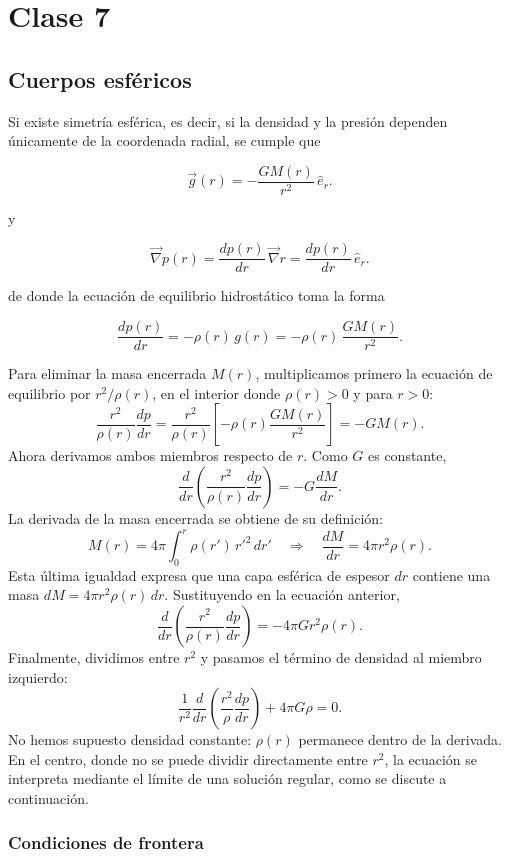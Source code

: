 \shorthandoff{<>}



\shorthandon{<>}

\chapter{Clase 7}

\section{Cuerpos esféricos}

Si existe simetría esférica, es decir, si la densidad y la presión dependen únicamente de la coordenada radial, se cumple que

$$ \vec{g}(r) = -\frac{G M(r)}{r^2}\,\hat{e}_r. $$

y

$$ \vec{\nabla}p(r) = \frac{dp(r)}{dr}\,\vec{\nabla}r = \frac{dp(r)}{dr}\,\hat{e}_r. $$

de donde la ecuación de equilibrio hidrostático toma la forma

$$ \frac{dp(r)}{dr} = -\rho(r)\,g(r) = -\rho(r)\,\frac{G M(r)}{r^2}. $$

Para eliminar la masa encerrada $M(r)$, multiplicamos primero la ecuación de equilibrio por $r^2/\rho(r)$, en el interior donde $\rho(r)>0$ y para $r>0$:
$$
\frac{r^2}{\rho(r)}\frac{dp}{dr}
=\frac{r^2}{\rho(r)}\left[-\rho(r)\frac{GM(r)}{r^2}\right]
=-GM(r).
$$
Ahora derivamos ambos miembros respecto de $r$. Como $G$ es constante,
$$
\frac{d}{dr}\left(\frac{r^2}{\rho(r)}\frac{dp}{dr}\right)
=-G\frac{dM}{dr}.
$$
La derivada de la masa encerrada se obtiene de su definición:
$$
M(r)=4\pi\int_0^r\rho(r')\,r'^2\,dr'
\quad\Longrightarrow\quad
\frac{dM}{dr}=4\pi r^2\rho(r).
$$
Esta última igualdad expresa que una capa esférica de espesor $dr$ contiene una masa $dM=4\pi r^2\rho(r)\,dr$. Sustituyendo en la ecuación anterior,
$$
\frac{d}{dr}\left(\frac{r^2}{\rho(r)}\frac{dp}{dr}\right)
=-4\pi G r^2\rho(r).
$$
Finalmente, dividimos entre $r^2$ y pasamos el término de densidad al miembro izquierdo:
$$
\boxed{
\frac{1}{r^2}\frac{d}{dr}\left(\frac{r^2}{\rho}\frac{dp}{dr}\right)
+4\pi G\rho=0
}.
$$
No hemos supuesto densidad constante: $\rho(r)$ permanece dentro de la derivada. En el centro, donde no se puede dividir directamente entre $r^2$, la ecuación se interpreta mediante el límite de una solución regular, como se discute a continuación.

\subsection{Condiciones de frontera}

